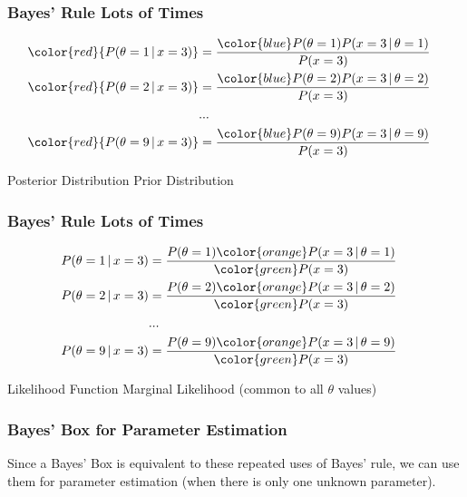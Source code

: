 \documentclass{beamer}
\newcommand{\given}{\,|\,}
\begin{document}
\begin{frame}
\frametitle{Bayes' Rule Lots of Times}
\begin{align}
\color{red}{P(\theta = 1 \given x = 3)} &= \frac{{\color{blue}P(\theta=1)}P(x=3 \given \theta=1)}{P(x=3)}\\
\color{red}{P(\theta = 2 \given x = 3)} &= \frac{{\color{blue}P(\theta=2)}P(x=3 \given \theta=2)}{P(x=3)}\\
&...&\\
\color{red}{P(\theta = 9 \given x = 3)} &= \frac{{\color{blue}P(\theta=9)}P(x=3 \given \theta=9)}{P(x=3)}\\
\end{align}

{\color{red}Posterior Distribution}
{\color{blue}Prior Distribution}

\end{frame}


\begin{frame}
\frametitle{Bayes' Rule Lots of Times}
\begin{align}
P(\theta = 1 \given x = 3) &= \frac{P(\theta=1){\color{orange}P(x=3 \given \theta=1)}}{\color{green}P(x=3)}\\
P(\theta = 2 \given x = 3) &= \frac{P(\theta=2){\color{orange}P(x=3 \given \theta=2)}}{\color{green}P(x=3)}\\
&...&\\
P(\theta = 9 \given x = 3) &= \frac{P(\theta=9){\color{orange}P(x=3 \given \theta=9)}}{\color{green}P(x=3)}\\
\end{align}

{\color{orange}Likelihood Function}
{\color{green}Marginal Likelihood (common to all $\theta$ values)}

\end{frame}

\begin{frame}
\frametitle{Bayes' Box for Parameter Estimation}
Since a Bayes' Box is equivalent to these repeated uses of Bayes' rule,
we can use them for parameter estimation (when there is only one unknown
parameter).

\end{frame}
\end{document}
